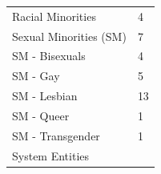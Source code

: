 \documentclass[]{tufte-handout}
\begin{document}
\begin{longtable}[]{@{}ll@{}}
\begin{minipage}[t]{0.59\columnwidth}
Racial Minorities\strut
\end{minipage} & \begin{minipage}[t]{0.21\columnwidth}\raggedright\strut
4\strut
\end{minipage}\tabularnewline
\begin{minipage}[t]{0.59\columnwidth}\raggedright\strut
Sexual Minorities (SM)\strut
\end{minipage} & \begin{minipage}[t]{0.21\columnwidth}\raggedright\strut
7\strut
\end{minipage}\tabularnewline
\begin{minipage}[t]{0.59\columnwidth}\raggedright\strut
SM - Bisexuals\strut
\end{minipage} & \begin{minipage}[t]{0.21\columnwidth}\raggedright\strut
4\strut
\end{minipage}\tabularnewline
\begin{minipage}[t]{0.59\columnwidth}\raggedright\strut
SM - Gay\strut
\end{minipage} & \begin{minipage}[t]{0.21\columnwidth}\raggedright\strut
5\strut
\end{minipage}\tabularnewline
\begin{minipage}[t]{0.59\columnwidth}\raggedright\strut
SM - Lesbian\strut
\end{minipage} & \begin{minipage}[t]{0.21\columnwidth}\raggedright\strut
13\strut
\end{minipage}\tabularnewline
\begin{minipage}[t]{0.59\columnwidth}\raggedright\strut
SM - Queer\strut
\end{minipage} & \begin{minipage}[t]{0.21\columnwidth}\raggedright\strut
1\strut
\end{minipage}\tabularnewline
\begin{minipage}[t]{0.59\columnwidth}\raggedright\strut
SM - Transgender\strut
\end{minipage} & \begin{minipage}[t]{0.21\columnwidth}\raggedright\strut
1\strut
\end{minipage}\tabularnewline
\begin{minipage}[t]{0.59\columnwidth}\raggedright\strut
System Entities\strut
\end{minipage} & \begin{minipage}[t]{0.21\columnwidth}\raggedright\strut

\end{minipage}
\end{longtable}
\end{document}
